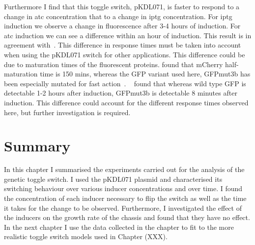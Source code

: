 Furthermore I find that this toggle switch, pKDL071, is faster to respond to a change in \acrshort{atc} concentration that to a change in \acrshort{iptg} concentration. For \acrshort{iptg} induction we observe a change in fluorescence after 3-4 hours of induction. For \acrshort{atc} induction we can see a difference within an hour of induction. This result is in agreement with~\textcite{Litcofsky:2012gr}. This difference in response times must be taken into account when using the pKDL071 switch for other applications. This difference could be due to maturation times of the fluorescent proteins. \textcite{Macdonald:2012el} found that mCherry half-maturation time is 150 mins, whereas the GFP variant used here, GFPmut3b has been especially mutated for fast action~\autocite{Cormack:1996gv}. ~\textcite{Cormack:1996gv} found that whereas wild type GFP is detectable 1-2 hours after induction, GFPmut3b is detectable 8 minutes after induction. This difference could account for the different response times observed here, but further investigation is required. 


\section{Summary}


In this chapter I summarised the experiments carried out for the analysis of the genetic toggle switch. I used the pKDL071 plasmid and characterised its switching behaviour over various inducer concentrations and over time. I found the concentration of each inducer necessary to flip the switch as well as the time it takes for the change to be observed. Furthermore, I investigated the effect of the inducers on the growth rate of the chassis and found that they have no effect. In the next chapter I use the data collected in the chapter to fit to the more realistic toggle switch models used in Chapter (XXX). 





 
 
